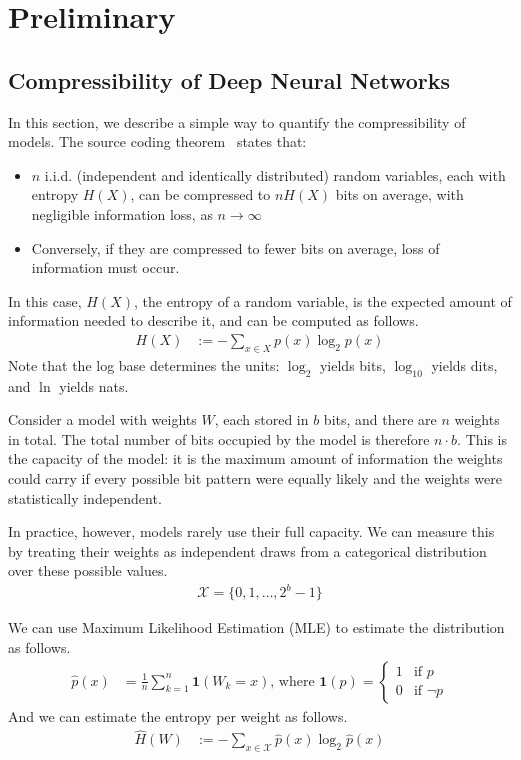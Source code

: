 \documentclass[../main.tex]{subfiles}
\begin{document}
\chapter{Preliminary} \label{chap:preliminary}

\section{Compressibility of Deep Neural Networks}
In this section, we describe a simple way to quantify the compressibility of models. The source coding theorem~\cite{shannonInformationTheory} states that:
\begin{itemize}
    \item $n$ i.i.d. (independent and identically distributed) random variables, each with entropy $H(X)$, can be compressed to $nH(X)$ bits on average, with negligible information loss, as $n \rightarrow \infty$ 
    \item Conversely, if they are compressed to fewer bits on average, loss of information must occur.
\end{itemize}
In this case, $H(X)$, the entropy of a random variable, is the expected amount of information needed to describe it, and can be computed as follows.
\begin{align}
H(X)&:=-\sum_{x\in X}p(x)\log_2 p(x)
\end{align}
Note that the log base determines the units: $\log_2$ yields bits, $\log_{10}$ yields dits, and $\ln$ yields nats.

Consider a model with weights $W$, each stored in $b$ bits, and there are $n$ weights in total. The total number of bits occupied by the model is therefore $n\cdot b$. This is the capacity of the model: it is the maximum amount of information the weights could carry if every possible bit pattern were equally likely and the weights were statistically independent. 

In practice, however, models rarely use their full capacity. We can measure this by treating their weights as independent draws from a categorical distribution over these possible values.
\begin{align}
    \mathcal{X} = \{0, 1, \dots, 2^b-1\}
\end{align}

We can use Maximum Likelihood Estimation (MLE) to estimate the distribution as follows.
\begin{align}
    \hat{p}(x) &= \frac1n \sum^n_{k=1} \mathbf{1} (W_k=x) 
\text{, where } \mathbf{1}(p)=\begin{cases}
1 & \text{if }p\\
0 & \text{if }\neg p
\end{cases}
\end{align}
And we can estimate the entropy per weight as follows.
\begin{align}
    \hat{H}(W)&:=-\sum_{x\in \mathcal{X}}\hat{p}(x)\log_2 \hat{p}(x)
\end{align}
\end{document}
